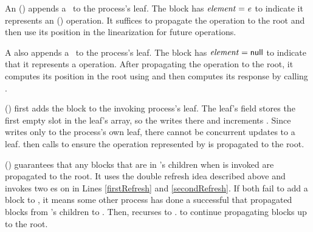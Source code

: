 An () appends a \block\ to the process's leaf.
The block has $\mbox{\textit{element}}=\mbox{\textnormal{\textit{e}}}$ to indicate it represents an () operation.
It suffices to propagate the operation to the root and
then use its position in the linearization for future 
operations.

A  also appends a \block\ to the process's leaf.
The block has $\mbox{\textit{element}}=\mbox{\sf null}$ to indicate that it represents a  operation.
After propagating the operation to the root, it computes
its position in the root using
 and then computes its response by calling . 

() first adds the block  to the invoking process's leaf.
The leaf's  field stores the first empty slot in the leaf's  array,
so the  writes  there and increments .
Since  writes only to the process's own leaf, there cannot be concurrent updates to a leaf.
 then calls  to ensure the operation represented by  is propagated to the root.

() guarantees that any blocks that are in 's children when  is invoked are propagated to the root.
It uses the double refresh idea described
above and invokes two es on  in Lines
\ref{firstRefresh} and \ref{secondRefresh}. 
If both fail to add a block to , it means some other process has done a successful 
that propagated blocks from 's children to .
Then,  recurses to . to continue propagating blocks up to the root.  

